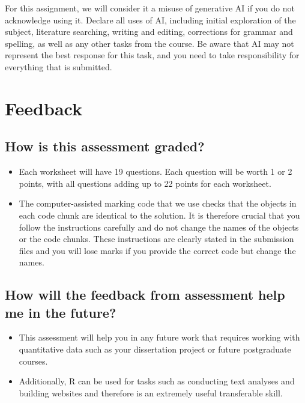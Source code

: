\documentclass[
  english,
  letterpaper,
  DIV=11,
  numbers=noendperiod]{scrreprt}
\begin{document}
For this assignment, we will consider it a misuse of generative AI if
you do not acknowledge using it. Declare all uses of AI, including
initial exploration of the subject, literature searching, writing and
editing, corrections for grammar and spelling, as well as any other
tasks from the course. Be aware that AI may not represent the best
response for this task, and you need to take responsibility for
everything that is submitted.

\section{Feedback}\label{data_skills_feedback}

\subsection{How is this assessment
graded?}\label{how-is-this-assessment-graded}

\begin{itemize}
\item
  Each worksheet will have 19 questions. Each question will be worth 1
  or 2 points, with all questions adding up to 22 points for each
  worksheet.
\item
  The computer-assisted marking code that we use checks that the objects
  in each code chunk are identical to the solution. It is therefore
  crucial that you follow the instructions carefully and do not change
  the names of the objects or the code chunks. These instructions are
  clearly stated in the submission files and you will lose marks if you
  provide the correct code but change the names.
\end{itemize}

\subsection{How will the feedback from assessment help me in the
future?}\label{how-will-the-feedback-from-assessment-help-me-in-the-future}

\begin{itemize}
\item
  This assessment will help you in any future work that requires working
  with quantitative data such as your dissertation project or future
  postgraduate courses.
\item
  Additionally, R can be used for tasks such as conducting text analyses
  and building websites and therefore is an extremely useful
  transferable skill.
\end{itemize}
\end{document}
